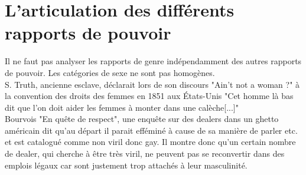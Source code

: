 \documentclass[12pt, a4paper, openany]{book}
\begin{document}
\section{L'articulation des différents rapports de pouvoir}

Il ne faut pas analyser les rapports de genre indépendamment des autres rapports de pouvoir. Les catégories de sexe ne sont pas homogènes. \\
S. Truth, ancienne esclave, déclarait lors de son discours "Ain't not a woman ?" à la convention des droits des femmes en 1851 aux États-Unis "Cet homme là bas dit que l'on doit aider les femmes à monter dans une calèche[...]" \\
Bourvois "En quête de respect", une enquête sur des dealers dans un ghetto américain dit qu'au départ il parait efféminé à cause de sa manière de parler etc. et est catalogué comme non viril donc gay. Il montre donc qu'un certain nombre de dealer, qui cherche à être très viril, ne peuvent pas se reconvertir dans des emplois légaux car sont justement trop attachés à leur masculinité.
\end{document}
